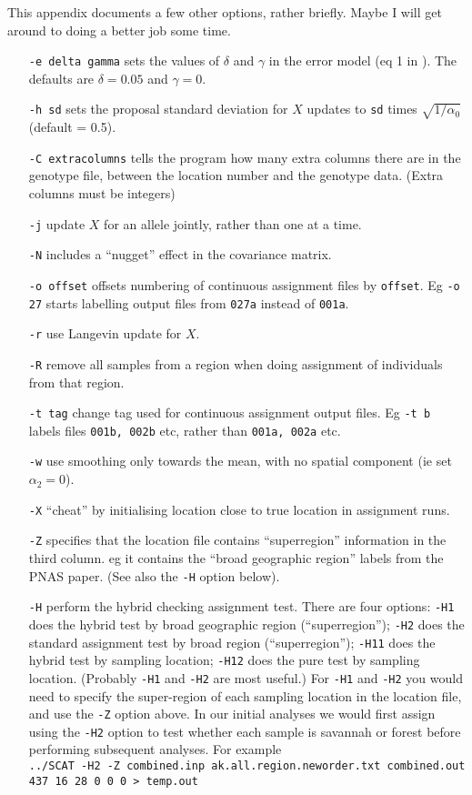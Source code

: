 \documentclass[11pt,titlepage,times,letterpaper]{article}
\begin{document}
This appendix documents a few other options, rather briefly.  Maybe I
will get around to doing a better job some time.
\begin{enumerate}[{\tt -f}]
\item[{\tt -e delta gamma}] sets the values of $\delta$ and $\gamma$
in the error model (eq 1 in \cite{wasser.etal.04}). The defaults are
$\delta = 0.05$ and $\gamma = 0$.  
\item[{\tt -h sd}] sets the
proposal standard deviation for $X$ updates to {\tt sd} times
$\sqrt{1/\alpha_0}$ (default = 0.5).  
\item[{\tt -C extracolumns}] tells the program how many extra columns there
are in the genotype file, between the location number and the genotype
data. (Extra columns must be integers)
\item[{\tt -j}] update $X$ for an allele jointly, rather than one at a time.
\item[{\tt -N}] includes a
``nugget'' effect in the covariance matrix.  
\item[{\tt -o offset}] offsets numbering of continuous assignment
files by {\tt offset}. Eg {\tt -o 27} starts labelling output files
from {\tt 027a} instead of {\tt 001a}.
\item[{\tt -r}] use Langevin update for $X$.  
\item[{\tt -R}] remove
all samples from a region when doing assignment of individuals from
that region.
\item[{\tt -t tag}] change tag used for continuous assignment output files.
Eg {\tt -t b} labels files {\tt 001b, 002b} etc, rather than {\tt 001a, 002a} etc.
\item[{\tt -w}] use smoothing only towards the mean, with no spatial component (ie set
$\alpha_2 = 0$).
\item[{\tt -X}] ``cheat'' by initialising location close to true location in assignment runs.
\item[{\tt -Z}] specifies that the location file contains ``superregion'' information in the third column.
eg it contains the ``broad geographic region'' labels from the PNAS paper. (See also the {\tt -H} option below).
\item[{\tt -H}] perform the hybrid checking assignment test. There are
four options: {\tt -H1} does the hybrid test by broad geographic
region (``superregion''); {\tt -H2} does the standard assignment test
by broad region (``superregion''); {\tt -H11} does the hybrid test by
sampling location; {\tt -H12} does the pure test by sampling
location. (Probably {\tt -H1} and {\tt -H2} are most useful.)  For {\tt -H1} and {\tt -H2} you would need to specify the super-region of
each sampling location in the location file, and use the {\tt -Z} option above. In our
initial analyses we would first assign using the {\tt -H2} option to test
whether each sample is savannah or forest before performing subsequent analyses.
For example \\ {\tt ../SCAT -H2 -Z combined.inp ak.all.region.neworder.txt combined.out 437 16 28 0 0 0 > temp.out}


\end{enumerate}
\end{document}
